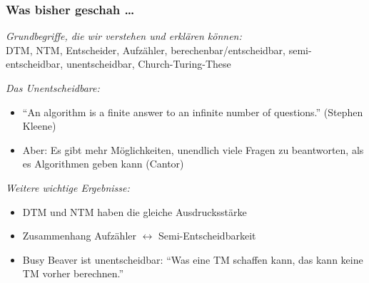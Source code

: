 \documentclass[onlymath]{beamer}
\begin{document}
\maketitle

\begin{frame}\frametitle{Was bisher geschah \ldots}

\emph{Grundbegriffe, die wir verstehen und erklären können:}\\
DTM, NTM, Entscheider, Aufzähler, berechenbar/entscheidbar, semi-entscheidbar, unentscheidbar, Church-Turing-These
\bigskip

\emph{Das Unentscheidbare:}
\begin{itemize}
\item "`An algorithm is a finite answer to an infinite number of questions."' (Stephen Kleene)
\item Aber: Es gibt mehr Möglichkeiten, unendlich viele Fragen zu beantworten, als es Algorithmen geben kann (Cantor)
\end{itemize}

\bigskip
\emph{Weitere wichtige Ergebnisse:}
\begin{itemize}
\item DTM und NTM haben die gleiche Ausdrucksstärke
\item Zusammenhang Aufzähler $\leftrightarrow$ Semi-Entscheidbarkeit
\item Busy Beaver ist unentscheidbar: "`Was eine TM schaffen kann, das kann keine TM vorher berechnen."'
\end{itemize}







\end{frame}

\end{document}
